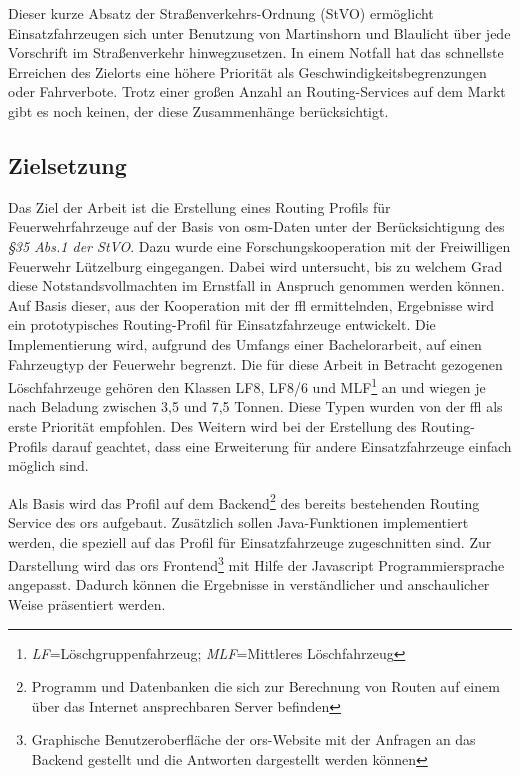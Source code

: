 \vspace{1.2cm}

Dieser kurze Absatz der Straßenverkehrs-Ordnung (StVO) ermöglicht Einsatzfahrzeugen sich unter Benutzung von Martinshorn und Blaulicht über jede Vorschrift im Straßenverkehr hinwegzusetzen.
In einem Notfall hat das schnellste Erreichen des Zielorts eine höhere Priorität als Geschwindigkeitsbegrenzungen oder Fahrverbote.
Trotz einer großen Anzahl an Routing-Services auf dem Markt gibt es noch keinen, der diese Zusammenhänge berücksichtigt.

\subsection{Zielsetzung}
Das Ziel der Arbeit ist die Erstellung eines Routing Profils für Feuerwehrfahrzeuge auf der Basis von \gls{osm}-Daten unter der Berücksichtigung des \textit{§35 Abs.1 der StVO}. Dazu wurde eine Forschungskooperation mit der Freiwilligen Feuerwehr Lützelburg eingegangen. Dabei wird untersucht, bis zu welchem Grad diese Notstandsvollmachten im Ernstfall in Anspruch genommen werden können.
Auf Basis dieser, aus der Kooperation mit der \gls{ffl} ermittelnden, Ergebnisse wird ein prototypisches Routing-Profil für Einsatzfahrzeuge entwickelt.
Die Implementierung wird, aufgrund des Umfangs einer Bachelorarbeit, auf einen Fahrzeugtyp der Feuerwehr begrenzt.
Die für diese Arbeit in Betracht gezogenen Löschfahrzeuge gehören den Klassen LF8, LF8/6 und MLF\footnote{\textit{LF}=Löschgruppenfahrzeug; \textit{MLF}=Mittleres Löschfahrzeug} an und wiegen je nach Beladung zwischen 3,5 und 7,5 Tonnen.
Diese Typen wurden von der \gls{ffl} als erste Priorität empfohlen.
Des Weitern wird bei der Erstellung des Routing-Profils darauf geachtet, dass eine Erweiterung für andere Einsatzfahrzeuge einfach möglich sind.
\vspace{0.5cm}

Als Basis wird das Profil auf dem Backend\footnote{Programm und Datenbanken die sich zur Berechnung von Routen auf einem über das Internet ansprechbaren Server befinden} des bereits bestehenden Routing Service des \gls{ors} aufgebaut.
Zusätzlich sollen Java-Funktionen implementiert werden, die speziell auf das Profil für Einsatzfahrzeuge zugeschnitten sind.
Zur Darstellung wird das \gls{ors} Frontend\footnote{Graphische Benutzeroberfläche der \gls{ors}-Website mit der Anfragen an das Backend gestellt und die Antworten dargestellt werden können} mit Hilfe der Javascript Programmiersprache angepasst.
Dadurch können die Ergebnisse in verständlicher und anschaulicher Weise präsentiert werden.